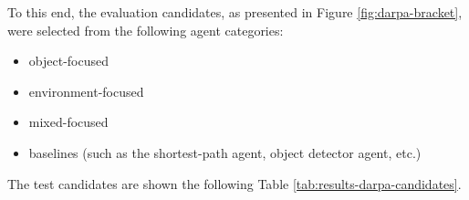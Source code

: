 
To this end, the evaluation candidates, as presented in Figure \ref{fig:darpa-bracket}, were selected from the following agent categories: 
\begin{itemize}
    \item object-focused
    \item environment-focused
    \item mixed-focused
    \item baselines (such as the shortest-path agent, object detector agent, etc.)
\end{itemize}
The test candidates are shown the following Table \ref{tab:results-darpa-candidates}. 





